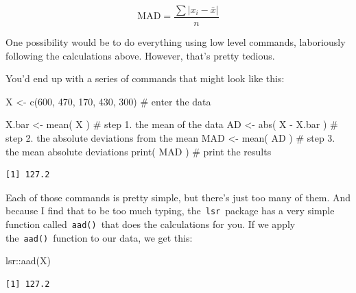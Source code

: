 \documentclass[
  letterpaper,
  DIV=11,
  numbers=noendperiod]{scrartcl}
\newenvironment{Shaded}{\begin{snugshade}}{\end{snugshade}}
\newcommand{\CommentTok}[1]{\textcolor[rgb]{0.37,0.37,0.37}{#1}}
\newcommand{\DecValTok}[1]{\textcolor[rgb]{0.68,0.00,0.00}{#1}}
\newcommand{\FunctionTok}[1]{\textcolor[rgb]{0.28,0.35,0.67}{#1}}
\newcommand{\NormalTok}[1]{\textcolor[rgb]{0.00,0.23,0.31}{#1}}
\newcommand{\OtherTok}[1]{\textcolor[rgb]{0.00,0.23,0.31}{#1}}
\newcommand{\SpecialCharTok}[1]{\textcolor[rgb]{0.37,0.37,0.37}{#1}}
\begin{document}
\[\mathrm{MAD} = \frac{\sum \lvert x_i - \bar{x} \rvert}{n}\]

One possibility would be to do everything using low level commands,
laboriously following the calculations above. However, that's pretty
tedious.

You'd end up with a series of commands that might look like this:

\begin{Shaded}
\begin{Highlighting}[]
\NormalTok{X }\OtherTok{\textless{}{-}} \FunctionTok{c}\NormalTok{(}\DecValTok{600}\NormalTok{, }\DecValTok{470}\NormalTok{, }\DecValTok{170}\NormalTok{, }\DecValTok{430}\NormalTok{, }\DecValTok{300}\NormalTok{)   }\CommentTok{\# enter the data}
\end{Highlighting}
\end{Shaded}

\begin{Shaded}
\begin{Highlighting}[]
\NormalTok{X.bar }\OtherTok{\textless{}{-}} \FunctionTok{mean}\NormalTok{( X )       }\CommentTok{\# step 1. the mean of the data}
\NormalTok{AD }\OtherTok{\textless{}{-}} \FunctionTok{abs}\NormalTok{( X }\SpecialCharTok{{-}}\NormalTok{ X.bar )   }\CommentTok{\# step 2. the absolute deviations from the mean}
\NormalTok{MAD }\OtherTok{\textless{}{-}} \FunctionTok{mean}\NormalTok{( AD )        }\CommentTok{\# step 3. the mean absolute deviations}
\FunctionTok{print}\NormalTok{( MAD )             }\CommentTok{\# print the results}
\end{Highlighting}
\end{Shaded}

\begin{verbatim}
[1] 127.2
\end{verbatim}

Each of those commands is pretty simple, but there's just too many of
them. And because I find that to be too much typing,
the~\texttt{lsr}~package has a very simple function
called~\texttt{aad()}~that does the calculations for you. If we apply
the~\texttt{aad()}~function to our data, we get this:

\begin{Shaded}
\begin{Highlighting}[]
\NormalTok{lsr}\SpecialCharTok{::}\FunctionTok{aad}\NormalTok{(X)}
\end{Highlighting}
\end{Shaded}

\begin{verbatim}
[1] 127.2
\end{verbatim}
\end{document}
